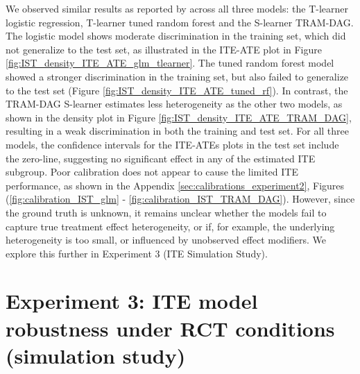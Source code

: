 We observed similar results as reported by \citet{chen2025} across all three models: the T-learner logistic regression, T-learner tuned random forest and the S-learner TRAM-DAG. The logistic model shows moderate discrimination in the training set, which did not generalize to the test set, as illustrated in the ITE-ATE plot in Figure \ref{fig:IST_density_ITE_ATE_glm_tlearner}. The tuned random forest model showed a stronger discrimination in the training set, but also failed to generalize to the test set (Figure \ref{fig:IST_density_ITE_ATE_tuned_rf}). In contrast, the TRAM-DAG S-learner estimates less heterogeneity as the other two models, as shown in the density plot in Figure \ref{fig:IST_density_ITE_ATE_TRAM_DAG}, resulting in a weak discrimination in both the training and test set. For all three models, the confidence intervals for the ITE-ATEs plots in the test set include the zero-line, suggesting no significant effect in any of the estimated ITE subgroup. Poor calibration does not appear to cause the limited ITE performance, as shown in the Appendix \ref{sec:calibrations_experiment2}, Figures (\ref{fig:calibration_IST_glm} - \ref{fig:calibration_IST_TRAM_DAG}). However, since the ground truth is unknown, it remains unclear whether the models fail to capture true treatment effect heterogeneity, or if, for example, the underlying heterogeneity is too small, or influenced by unobserved effect modifiers. We explore this further in Experiment 3 (ITE Simulation Study).



\section{Experiment 3: ITE model robustness under RCT conditions (simulation study)}

